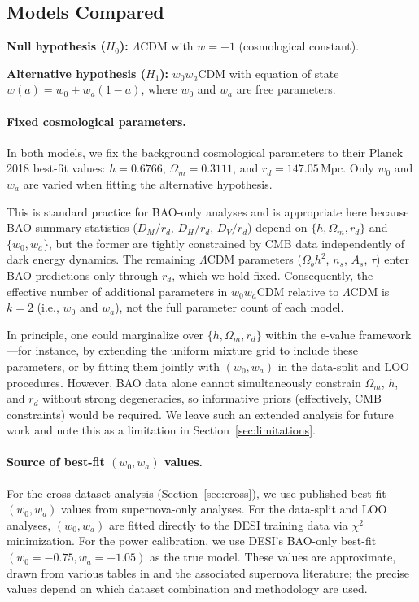 \documentclass[11pt,a4paper]{article}
\newcommand{\LCDM}{$\Lambda$CDM}
\begin{document}
\subsection{Models Compared}
\label{sec:models}

\textbf{Null hypothesis ($H_0$):} \LCDM{} with $w = -1$ (cosmological constant).

\textbf{Alternative hypothesis ($H_1$):} $w_0w_a$CDM with equation of state $w(a) = w_0 + w_a(1-a)$, where $w_0$ and $w_a$ are free parameters.

\paragraph{Fixed cosmological parameters.} In both models, we fix the background cosmological parameters to their Planck 2018 best-fit values: $h = 0.6766$, $\Omega_m = 0.3111$, and $r_d = 147.05\,$Mpc. Only $w_0$ and $w_a$ are varied when fitting the alternative hypothesis.

This is standard practice for BAO-only analyses and is appropriate here because BAO summary statistics ($D_M/r_d$, $D_H/r_d$, $D_V/r_d$) depend on $\{h, \Omega_m, r_d\}$ and $\{w_0, w_a\}$, but the former are tightly constrained by CMB data independently of dark energy dynamics. The remaining \LCDM{} parameters ($\Omega_b h^2$, $n_s$, $A_s$, $\tau$) enter BAO predictions only through $r_d$, which we hold fixed. Consequently, the effective number of additional parameters in $w_0w_a$CDM relative to \LCDM{} is $k = 2$ (i.e., $w_0$ and $w_a$), not the full parameter count of each model.

In principle, one could marginalize over $\{h, \Omega_m, r_d\}$ within the e-value framework---for instance, by extending the uniform mixture grid to include these parameters, or by fitting them jointly with $(w_0, w_a)$ in the data-split and LOO procedures. However, BAO data alone cannot simultaneously constrain $\Omega_m$, $h$, and $r_d$ without strong degeneracies, so informative priors (effectively, CMB constraints) would be required. We leave such an extended analysis for future work and note this as a limitation in Section~\ref{sec:limitations}.

\paragraph{Source of best-fit $(w_0, w_a)$ values.} For the cross-dataset analysis (Section~\ref{sec:cross}), we use published best-fit $(w_0, w_a)$ values from supernova-only analyses. For the data-split and LOO analyses, $(w_0, w_a)$ are fitted directly to the DESI training data via $\chi^2$ minimization. For the power calibration, we use DESI's BAO-only best-fit $(w_0 = -0.75, w_a = -1.05)$ as the true model. These values are approximate, drawn from various tables in \citet{DESI2025} and the associated supernova literature; the precise values depend on which dataset combination and methodology are used.
\end{document}

